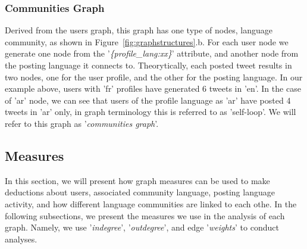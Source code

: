 \documentclass{llncs}
\begin{document}
\subsubsection{Communities Graph} \label{communitiesgraph}
Derived from the users graph, this graph has one type of nodes, language community,
as shown in Figure~\ref{fig:graphstructures}.b. For each user node we generate one 
node from the '{\emph{\{profile\_lang:xx\}}}' attribute, and another node from the posting 
language it connects to. Theorytically, each posted tweet results in two nodes, one for 
the user profile, and the other for the posting language. In our example above, users 
with 'fr' profiles have generated 6 tweets in 'en'. In the case of 'ar' node, we can see that 
users of the profile language as 'ar' have posted 4 tweets in 'ar' only, in graph terminology
this is referred to as 'self-loop'. We will refer to this graph as '\emph{communities graph}'.

\subsection{Measures}
In this section, we will present how graph measures can be used to 
make deductions about users, associated community language, posting language
activity, and how different language communities are linked to each othe. 
In the following subsections, we present the measures we use in the analysis 
of each graph. Namely, we use '\emph{indegree}', '\emph{outdegree}', and edge 
'\emph{weights}' to conduct analyses.
\end{document}
